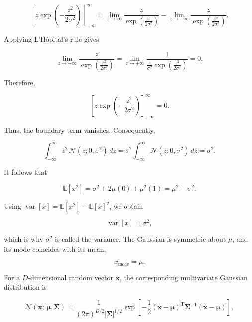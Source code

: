 \documentclass[10pt,twocolumn]{memoir}
\begin{document}
\begin{equation}
    \left[z\exp\left(-\frac{z^2}{2\sigma^2}\right)\right]_{-\infty}^{\infty}
    =
    \lim_{z\to\infty} \frac{z}{\exp\left(\frac{z^2}{2\sigma^2}\right)}
    -
    \lim_{z\to-\infty} \frac{z}{\exp\left(\frac{z^2}{2\sigma^2}\right)}.
\end{equation}

Applying L'Hôpital's rule gives

\begin{equation}
    \lim_{z\to\pm\infty}\frac{z}{\exp\left(\frac{z^2}{2\sigma^2}\right)}
    =
    \lim_{z\to\pm\infty}\frac{1}{\frac{z}{\sigma^2}\exp\left(\frac{z^2}{2\sigma^2}\right)}
    = 0.
\end{equation}

Therefore,

\begin{equation}
    \left[z\exp\left(-\frac{z^2}{2\sigma^2}\right)\right]_{-\infty}^{\infty} = 0.
\end{equation}

Thus, the boundary term vanishes. Consequently,

\begin{equation}
    \int_{-\infty}^{\infty}z^2\,\mathcal{N}(z;0,\sigma^2)\,dz = \sigma^2\int_{-\infty}^{\infty}\mathcal{N}(z;0,\sigma^2)\,dz = \sigma^2.
\end{equation}

It follows that

\begin{equation}
    \mathbb{E}[x^2] = \sigma^2 + 2\mu(0) + \mu^2(1) = \mu^2+\sigma^2.
\end{equation}

Using $\operatorname{var}[x]=\mathbb{E}[x^2]-\mathbb{E}[x]^2$, we obtain

\begin{equation}
    \operatorname{var}[x] = \sigma^2,
\end{equation}

which is why $\sigma^2$ is called the variance. The Gaussian is symmetric about $\mu$, and its mode coincides with its mean,

\begin{equation}
    x_{\mathrm{mode}} = \mu.
\end{equation}

For a $D$-dimensional random vector $\mathbf{x}$, the corresponding multivariate Gaussian distribution is

\begin{equation}
    \mathcal{N}(\mathbf{x};\,\boldsymbol{\mu},\boldsymbol{\Sigma})
    =
    \frac{1}{(2\pi)^{D/2}|\boldsymbol{\Sigma}|^{1/2}}\exp\left[-\frac{1}{2}(\mathbf{x}-\boldsymbol{\mu})^{\mathrm{T}}\boldsymbol{\Sigma}^{-1}(\mathbf{x}-\boldsymbol{\mu})\right],
\label{eq:c1_multivariate_gaussian}
\end{equation}
\end{document}
